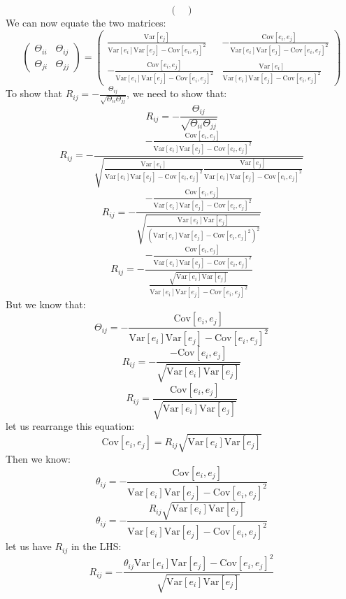 \documentclass[a3paper,12pt]{extarticle} %
\begin{document}
\begin{enumerate}
\[\begin{pmatrix}
    \end{pmatrix}
    \]
    We can now equate the two matrices:
    \[
    \begin{pmatrix}
    \Theta_{ii} & \Theta_{ij} \\
    \Theta_{ji} & \Theta_{jj}
    \end{pmatrix}
    =
    \begin{pmatrix}
    \frac{\text{Var}[e_j]}{\text{Var}[e_i] \text{Var}[e_j] - \text{Cov}[e_i, e_j]^2} & -\frac{\text{Cov}[e_i, e_j]}{\text{Var}[e_i] \text{Var}[e_j] - \text{Cov}[e_i, e_j]^2} \\
    -\frac{\text{Cov}[e_i, e_j]}{\text{Var}[e_i] \text{Var}[e_j] - \text{Cov}[e_i, e_j]^2} & \frac{\text{Var}[e_i]}{\text{Var}[e_i] \text{Var}[e_j] - \text{Cov}[e_i, e_j]^2}
    \end{pmatrix}
    \]
    To show that \( R_{ij} = -\frac{\Theta_{ij}}{\sqrt{\Theta_{ii} \Theta_{jj}}} \), we need to show that:
    \[
    R_{ij} = -\frac{\Theta_{ij}}{\sqrt{\Theta_{ii} \Theta_{jj}}}
    \]
    \[
    R_{ij} = -\frac{-\frac{\text{Cov}[e_i, e_j]}{\text{Var}[e_i] \text{Var}[e_j] - \text{Cov}[e_i, e_j]^2}}{\sqrt{\frac{\text{Var}[e_i]}{\text{Var}[e_i] \text{Var}[e_j] - \text{Cov}[e_i, e_j]^2} \frac{\text{Var}[e_j]}{\text{Var}[e_i] \text{Var}[e_j] - \text{Cov}[e_i, e_j]^2}}}
    \]
    \[
    R_{ij} = -\frac{-\frac{\text{Cov}[e_i, e_j]}{\text{Var}[e_i] \text{Var}[e_j] - \text{Cov}[e_i, e_j]^2}}{\sqrt{\frac{\text{Var}[e_i] \text{Var}[e_j]}{(\text{Var}[e_i] \text{Var}[e_j] - \text{Cov}[e_i, e_j]^2)^2}}}
    \]
    \[
    R_{ij} = -\frac{-\frac{\text{Cov}[e_i, e_j]}{\text{Var}[e_i] \text{Var}[e_j] - \text{Cov}[e_i, e_j]^2}}{\frac{\sqrt{\text{Var}[e_i] \text{Var}[e_j]}}{\text{Var}[e_i] \text{Var}[e_j] - \text{Cov}[e_i, e_j]^2}}
    \]
    But we know that:
    \[
        \Theta_{ij} = -\frac{\text{Cov}[e_i, e_j]}{\text{Var}[e_i] \text{Var}[e_j] - \text{Cov}[e_i, e_j]^2}
    \]
    \[
    R_{ij} = -\frac{-\text{Cov}[e_i, e_j]}{\sqrt{\text{Var}[e_i] \text{Var}[e_j]}}
    \]
    \[
    R_{ij} = \frac{\text{Cov}[e_i, e_j]}{\sqrt{\text{Var}[e_i] \text{Var}[e_j]}}
    \]
    let us rearrange this equation:
    \[
    \text{Cov}[e_i, e_j] = R_{ij} \sqrt{\text{Var}[e_i] \text{Var}[e_j]}
    \]
    Then we know:
    \[
    \theta_{ij} = -\frac{\text{Cov}[e_i, e_j]}{\text{Var}[e_i] \text{Var}[e_j] - \text{Cov}[e_i, e_j]^2}
    \]
    \[
    \theta_{ij} = -\frac{R_{ij} \sqrt{\text{Var}[e_i] \text{Var}[e_j]}}{\text{Var}[e_i] \text{Var}[e_j] - \text{Cov}[e_i, e_j]^2}
    \]
    let us have \(R_{ij}\) in the LHS:
    \[
    R_{ij} = -\frac{\theta_{ij} \text{Var}[e_i] \text{Var}[e_j] - \text{Cov}[e_i, e_j]^2}{\sqrt{\text{Var}[e_i] \text{Var}[e_j]}}
\]
\end{enumerate}
\end{document}
